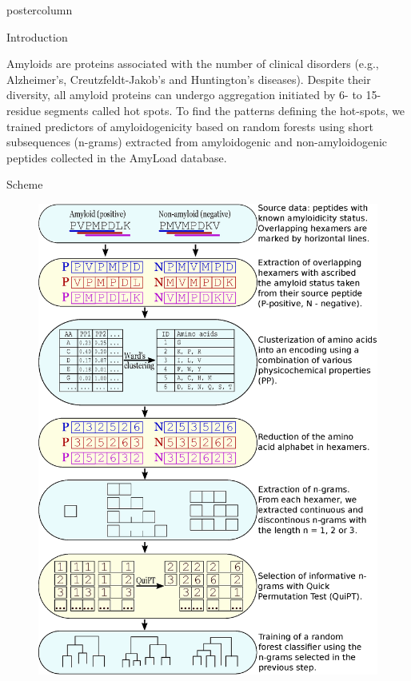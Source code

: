 \documentclass[final]{beamer}\usepackage[]{graphicx}\usepackage[]{color}
\newlength{\columnheight}
\begin{document}
\begin{frame}
\begin{columns}
\begin{column}{.53\textwidth}
\begin{beamercolorbox}[center,wd=\textwidth]{postercolumn}
\begin{minipage}[T]{.95\textwidth}
\parbox[t][\columnheight]{\textwidth}
{
\begin{block}{Introduction}

Amyloids are proteins associated with the number of clinical disorders (e.g., Alzheimer's, Creutzfeldt-Jakob's and Huntington's diseases). Despite their diversity, all amyloid proteins can undergo aggregation initiated by 6- to \mbox{15-residue} segments called hot spots. To find the patterns defining the hot-spots, we trained predictors of amyloidogenicity based on random forests using short subsequences (n-grams) extracted from amyloidogenic and non-amyloidogenic peptides collected in the AmyLoad database.

    \end{block}

\begin{block}{Scheme}
\begin{figure} 
\includegraphics[width=0.81\columnwidth]{static_figure/ngram_scheme_poster.eps}
\end{figure}


\end{block}}
\end{minipage}
\end{beamercolorbox}
\end{column}
\end{columns}
\end{frame}
\end{document}
